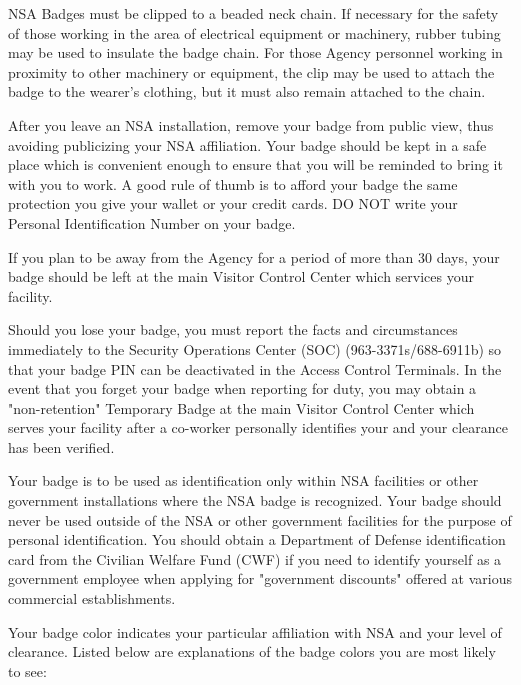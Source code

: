 \documentclass[a4]{article}
\begin{document}
NSA Badges must be clipped to a beaded neck chain.  If necessary for the safety
of those working in the area of electrical equipment or machinery, rubber
tubing may be used to insulate the badge chain.  For those Agency personnel
working in proximity to other machinery or equipment, the clip may be used to
attach the badge to the wearer's clothing, but it must also remain attached to
the chain.

After you leave an NSA installation, remove your badge from public view, thus
avoiding publicizing your NSA affiliation.  Your badge should be kept in a
safe place which is convenient enough to ensure that you will be reminded to
bring it with you to work.  A good rule of thumb is to afford your badge the
same protection you give your wallet or your credit cards.  DO NOT write your
Personal Identification Number on your badge.

If you plan to be away from the Agency for a period of more than 30 days, your
badge should be left at the main Visitor Control Center which services your
facility.

Should you lose your badge, you must report the facts and circumstances
immediately to the Security Operations Center (SOC) (963-3371s/688-6911b) so
that your badge PIN can be deactivated in the Access Control Terminals.  In the
event that you forget your badge when reporting for duty, you may obtain a
"non-retention" Temporary Badge at the main Visitor Control Center which serves
your facility after a co-worker personally identifies your and your clearance
has been verified.

Your badge is to be used as identification only within NSA facilities or other
government installations where the NSA badge is recognized.  Your badge should
never be used outside of the NSA or other government facilities for the purpose
of personal identification.  You should obtain a Department of Defense
identification card from the Civilian Welfare Fund (CWF) if you need to
identify yourself as a government employee when applying for "government
discounts" offered at various commercial establishments.

Your badge color indicates your particular affiliation with NSA and your level
of clearance.  Listed below are explanations of the badge colors you are most
likely to see:
\end{document}
